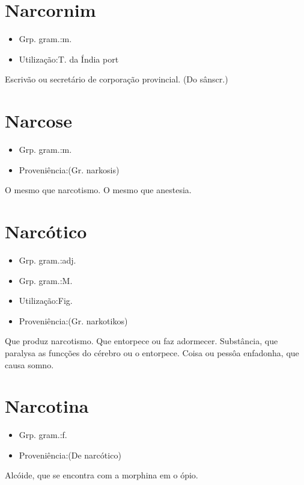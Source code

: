 \section{Narcornim}
\begin{itemize}
\item {Grp. gram.:m.}
\end{itemize}
\begin{itemize}
\item {Utilização:T. da Índia port}
\end{itemize}
Escrivão ou secretário de corporação provincial.
(Do sânscr.)
\section{Narcose}
\begin{itemize}
\item {Grp. gram.:m.}
\end{itemize}
\begin{itemize}
\item {Proveniência:(Gr. \textunderscore narkosis\textunderscore )}
\end{itemize}
O mesmo que \textunderscore narcotismo\textunderscore .
O mesmo que \textunderscore anestesia\textunderscore .
\section{Narcótico}
\begin{itemize}
\item {Grp. gram.:adj.}
\end{itemize}
\begin{itemize}
\item {Grp. gram.:M.}
\end{itemize}
\begin{itemize}
\item {Utilização:Fig.}
\end{itemize}
\begin{itemize}
\item {Proveniência:(Gr. \textunderscore narkotikos\textunderscore )}
\end{itemize}
Que produz narcotismo.
Que entorpece ou faz adormecer.
Substância, que paralysa as funcções do cérebro ou o entorpece.
Coisa ou pessôa enfadonha, que causa somno.
\section{Narcotina}
\begin{itemize}
\item {Grp. gram.:f.}
\end{itemize}
\begin{itemize}
\item {Proveniência:(De \textunderscore narcótico\textunderscore )}
\end{itemize}
Alcóide, que se encontra com a morphina em o ópio.

